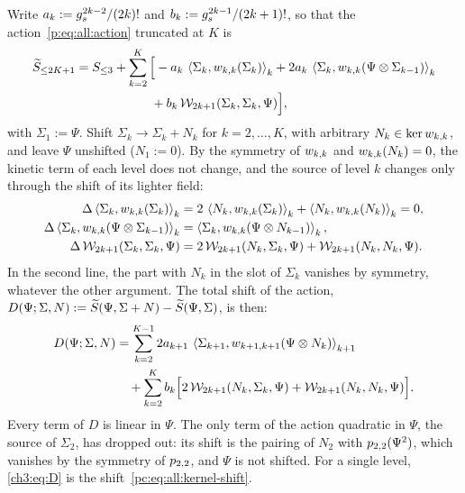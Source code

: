 Write $a_k := \gs^{2 k - 2} / (2 k)!$ and $b_k := \gs^{2 k - 1} / (2 k + 1)!$, so that the action~\eqref{p:eq:all:action} truncated at $K$ is
\begin{equation}
  \label{ch3:eq:action-abc}
  \begin{aligned}
    \caction[\le 2 K + 1]
      &
      = S_{\le 3}
        + \sum_{k = 2}^{K} \Big[
          - a_k \, \pair[k]{\Sigma_k}{\wprod{k}{k}(\Sigma_k)}
          + 2 a_k \, \pair[k]{\Sigma_k}{\wprod{k}{k}(\Psi \otimes \Sigma_{k - 1})}
      \\ &
      \qquad\qquad\qquad
          + b_k \, \dvertex{2 k + 1}(\Sigma_k, \Sigma_k, \Psi)
        \Big],
  \end{aligned}
\end{equation}
with $\Sigma_1 := \Psi$.
Shift $\Sigma_k \to \Sigma_k + N_k$ for $k = 2, \ldots, K$, with arbitrary $N_k \in \ker \wprod{k}{k}$, and leave $\Psi$ unshifted ($N_1 := 0$).
By the symmetry of $\wprod{k}{k}$ and $\wprod{k}{k}(N_k) = 0$, the kinetic term of each level does not change, and the source of level $k$ changes only through the shift of its lighter field:
\begin{equation}
  \label{ch3:eq:shift-terms}
  \begin{aligned}
    \Delta \pair[k]{\Sigma_k}{\wprod{k}{k}(\Sigma_k)}
      &
      = 2 \, \pair[k]{N_k}{\wprod{k}{k}(\Sigma_k)}
        + \pair[k]{N_k}{\wprod{k}{k}(N_k)}
      = 0,
    \\
    \Delta \pair[k]{\Sigma_k}{\wprod{k}{k}(\Psi \otimes \Sigma_{k - 1})}
      &
      = \pair[k]{\Sigma_k}{\wprod{k}{k}(\Psi \otimes N_{k - 1})},
    \\
    \Delta \, \dvertex{2 k + 1}(\Sigma_k, \Sigma_k, \Psi)
      &
      = 2 \, \dvertex{2 k + 1}(N_k, \Sigma_k, \Psi)
        + \dvertex{2 k + 1}(N_k, N_k, \Psi).
  \end{aligned}
\end{equation}
In the second line, the part with $N_k$ in the slot of $\Sigma_k$ vanishes by symmetry, whatever the other argument.
The total shift of the action, $D(\Psi; \Sigma, N) := \caction(\Psi, \Sigma + N) - \caction(\Psi, \Sigma)$, is then:
\begin{equation}
  \label{ch3:eq:D}
  \begin{aligned}
    D(\Psi; \Sigma, N)
      &
      = \sum_{k = 2}^{K - 1} 2 a_{k + 1} \, \pair[k + 1]{\Sigma_{k + 1}}{\wprod{k + 1}{k + 1}(\Psi \otimes N_k)}
      \\ &
      \quad
        + \sum_{k = 2}^{K} b_k \Big[
          2 \, \dvertex{2 k + 1}(N_k, \Sigma_k, \Psi)
          + \dvertex{2 k + 1}(N_k, N_k, \Psi)
        \Big].
  \end{aligned}
\end{equation}
Every term of $D$ is linear in $\Psi$.
The only term of the action quadratic in $\Psi$, the source of $\Sigma_2$, has dropped out: its shift is the pairing of $N_2$ with $\sprod{2}{2}(\Psi^2)$, which vanishes by the symmetry of $\sprod{2}{2}$, and $\Psi$ is not shifted.
For a single level, \eqref{ch3:eq:D} is the shift~\eqref{pc:eq:all:kernel-shift}.

